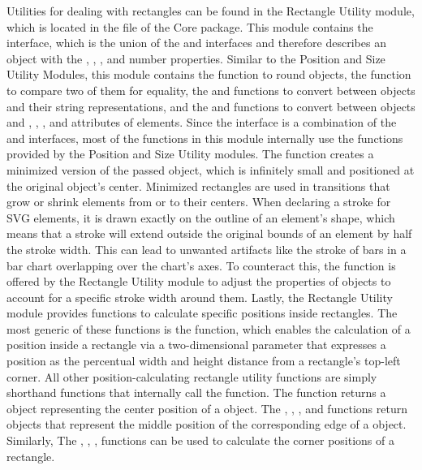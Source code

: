 Utilities for dealing with rectangles can be found in the
Rectangle Utility module, which is located in the
 file of the Core package. This
module contains the  interface, which is the union of the
 and  interfaces and therefore describes an
object with the , , , and 
number properties. Similar to the Position and Size Utility Modules,
this module contains the  function to round
 objects, the  function to compare two of
them for equality, the  and 
functions to convert between  objects and their string
representations, and the  and 
functions to convert between objects and , ,
, and  attributes of elements. Since
the  interface is a combination of the  and
 interfaces, most of the functions in this module
internally use the functions provided by the Position and
Size Utility modules. The  function
creates a minimized version of the passed  object, which is
infinitely small and positioned at the original  object's
center. Minimized rectangles are used in transitions that grow or
shrink  elements from or to their centers. When
declaring a stroke for SVG elements, it is drawn exactly on the
outline of an element's shape, which means that a stroke will extend
outside the original bounds of an element by half the stroke width.
This can lead to unwanted artifacts like the stroke of bars in a bar
chart overlapping over the chart's axes. To counteract this, the
 function is offered by the Rectangle
Utility module to adjust the properties of  objects to
account for a specific stroke width around them. Lastly, the
Rectangle Utility module provides functions to calculate
specific positions inside rectangles. The most generic of these
functions is the  function, which enables the
calculation of a position inside a rectangle via a two-dimensional
parameter that expresses a position as the percentual width and height
distance from a rectangle's top-left corner. All other
position-calculating rectangle utility functions are simply shorthand
functions that internally call the  function. The
 function returns a  object
representing the center position of a  object. The
, , , and
 functions return  objects that
represent the middle position of the corresponding edge of a
 object. Similarly, The ,
, , 
functions can be used to calculate the corner positions of a
rectangle.

